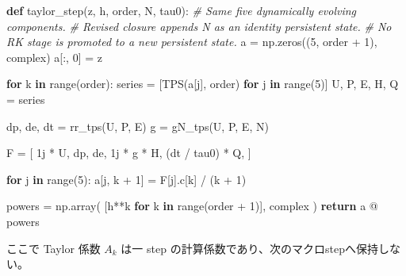 \documentclass[
  a4paper,
]{ltjsarticle}
\newenvironment{Shaded}{}{}
\newcommand{\BuiltInTok}[1]{\textcolor[rgb]{0.00,0.50,0.00}{#1}}
\newcommand{\CommentTok}[1]{\textcolor[rgb]{0.38,0.63,0.69}{\textit{#1}}}
\newcommand{\ControlFlowTok}[1]{\textcolor[rgb]{0.00,0.44,0.13}{\textbf{#1}}}
\newcommand{\DecValTok}[1]{\textcolor[rgb]{0.25,0.63,0.44}{#1}}
\newcommand{\KeywordTok}[1]{\textcolor[rgb]{0.00,0.44,0.13}{\textbf{#1}}}
\newcommand{\NormalTok}[1]{#1}
\newcommand{\OperatorTok}[1]{\textcolor[rgb]{0.40,0.40,0.40}{#1}}
\newcommand{\OtherTok}[1]{\textcolor[rgb]{0.00,0.44,0.13}{#1}}
\begin{document}
\begin{Shaded}
\begin{Highlighting}[]
\KeywordTok{def}\NormalTok{ taylor\_step(z, h, order, N, tau0):}
    \CommentTok{\# Same five dynamically evolving components.}
    \CommentTok{\# Revised closure appends N as an identity persistent state.}
    \CommentTok{\# No RK stage is promoted to a new persistent state.}
\NormalTok{    a }\OperatorTok{=}\NormalTok{ np.zeros((}\DecValTok{5}\NormalTok{, order }\OperatorTok{+} \DecValTok{1}\NormalTok{), }\BuiltInTok{complex}\NormalTok{)}
\NormalTok{    a[:, }\DecValTok{0}\NormalTok{] }\OperatorTok{=}\NormalTok{ z}

    \ControlFlowTok{for}\NormalTok{ k }\KeywordTok{in} \BuiltInTok{range}\NormalTok{(order):}
\NormalTok{        series }\OperatorTok{=}\NormalTok{ [TPS(a[j], order) }\ControlFlowTok{for}\NormalTok{ j }\KeywordTok{in} \BuiltInTok{range}\NormalTok{(}\DecValTok{5}\NormalTok{)]}
\NormalTok{        U, P, E, H, Q }\OperatorTok{=}\NormalTok{ series}

\NormalTok{        dp, de, dt }\OperatorTok{=}\NormalTok{ rr\_tps(U, P, E)}
\NormalTok{        g }\OperatorTok{=}\NormalTok{ gN\_tps(U, P, E, N)}

\NormalTok{        F }\OperatorTok{=}\NormalTok{ [}
            \OtherTok{1j} \OperatorTok{*}\NormalTok{ U,}
\NormalTok{            dp,}
\NormalTok{            de,}
            \OtherTok{1j} \OperatorTok{*}\NormalTok{ g }\OperatorTok{*}\NormalTok{ H,}
\NormalTok{            (dt }\OperatorTok{/}\NormalTok{ tau0) }\OperatorTok{*}\NormalTok{ Q,}
\NormalTok{        ]}

        \ControlFlowTok{for}\NormalTok{ j }\KeywordTok{in} \BuiltInTok{range}\NormalTok{(}\DecValTok{5}\NormalTok{):}
\NormalTok{            a[j, k }\OperatorTok{+} \DecValTok{1}\NormalTok{] }\OperatorTok{=}\NormalTok{ F[j].c[k] }\OperatorTok{/}\NormalTok{ (k }\OperatorTok{+} \DecValTok{1}\NormalTok{)}

\NormalTok{    powers }\OperatorTok{=}\NormalTok{ np.array(}
\NormalTok{        [h}\OperatorTok{**}\NormalTok{k }\ControlFlowTok{for}\NormalTok{ k }\KeywordTok{in} \BuiltInTok{range}\NormalTok{(order }\OperatorTok{+} \DecValTok{1}\NormalTok{)],}
        \BuiltInTok{complex}
\NormalTok{    )}
    \ControlFlowTok{return}\NormalTok{ a }\OperatorTok{@}\NormalTok{ powers}
\end{Highlighting}
\end{Shaded}

ここで Taylor 係数 \(A_k\) は一 step
の計算係数であり、次のマクロstepへ保持しない。
\end{document}
